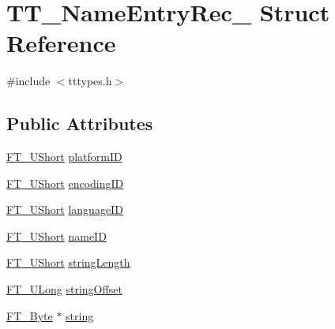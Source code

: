 \hypertarget{struct_t_t___name_entry_rec__}{\section{T\-T\-\_\-\-Name\-Entry\-Rec\-\_\- Struct Reference}
\label{struct_t_t___name_entry_rec__}
}


{\ttfamily \#include $<$tttypes.\-h$>$}

\subsection*{Public Attributes}
\begin{DoxyCompactItemize}
\item 
\hyperlink{fttypes_8h_a937f6c17cf5ffd09086d8610c37b9f58}{F\-T\-\_\-\-U\-Short} \hyperlink{struct_t_t___name_entry_rec___a9d4ee8bc42ed087f4533b6f664c0f6c6}{platform\-I\-D}
\item 
\hyperlink{fttypes_8h_a937f6c17cf5ffd09086d8610c37b9f58}{F\-T\-\_\-\-U\-Short} \hyperlink{struct_t_t___name_entry_rec___a8e7403a2f37c7f7fdb3c19e9549d315c}{encoding\-I\-D}
\item 
\hyperlink{fttypes_8h_a937f6c17cf5ffd09086d8610c37b9f58}{F\-T\-\_\-\-U\-Short} \hyperlink{struct_t_t___name_entry_rec___a2ec03c0ff0c542f403b45a515bb20afb}{language\-I\-D}
\item 
\hyperlink{fttypes_8h_a937f6c17cf5ffd09086d8610c37b9f58}{F\-T\-\_\-\-U\-Short} \hyperlink{struct_t_t___name_entry_rec___abdaaec01d6620b3801f233cde5964548}{name\-I\-D}
\item 
\hyperlink{fttypes_8h_a937f6c17cf5ffd09086d8610c37b9f58}{F\-T\-\_\-\-U\-Short} \hyperlink{struct_t_t___name_entry_rec___a736e5f8caeada86cc33f62acca6537f5}{string\-Length}
\item 
\hyperlink{fttypes_8h_a4fac88bdba78eb76b505efa6e4fbf3f5}{F\-T\-\_\-\-U\-Long} \hyperlink{struct_t_t___name_entry_rec___a33ed41d4d3c4fffa74193f3b52e11870}{string\-Offset}
\item 
\hyperlink{fttypes_8h_a51f26183ca0c9f4af958939648caeccd}{F\-T\-\_\-\-Byte} $\ast$ \hyperlink{struct_t_t___name_entry_rec___aefa752d5c88149f8e64122e14855d831}{string}
\end{DoxyCompactItemize}


